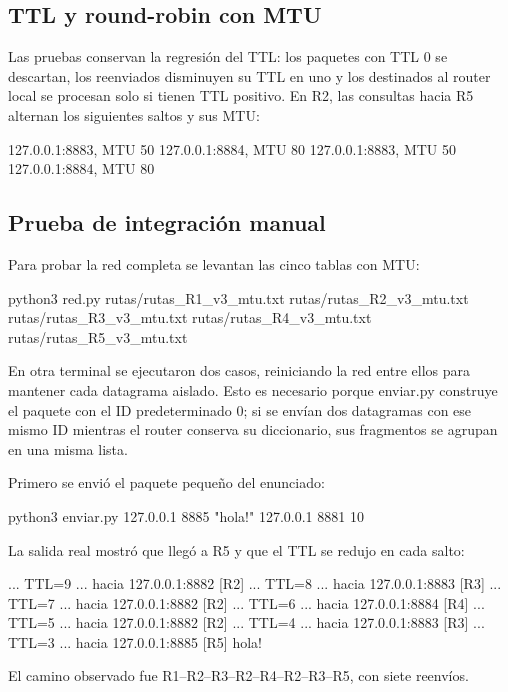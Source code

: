 \documentclass[
	spanish, %
	letterpaper, oneside
]{article}
\newcommand{\codeunderscore}{\textunderscore\allowbreak}
\newcommand{\code}[1]{{\let\_\codeunderscore#1}}     %
\begin{document}
\subsection{TTL y round-robin con MTU}
Las pruebas conservan la regresión del TTL: los paquetes con TTL 0 se descartan, los reenviados disminuyen su TTL en uno y los destinados al router local se procesan solo si tienen TTL positivo. En R2, las consultas hacia R5 alternan los siguientes saltos y sus MTU:
\begin{salida}
127.0.0.1:8883, MTU 50
127.0.0.1:8884, MTU 80
127.0.0.1:8883, MTU 50
127.0.0.1:8884, MTU 80
\end{salida}

\subsection{Prueba de integración manual}
Para probar la red completa se levantan las cinco tablas con MTU:
\begin{salida}
python3 red.py rutas/rutas_R1_v3_mtu.txt rutas/rutas_R2_v3_mtu.txt rutas/rutas_R3_v3_mtu.txt rutas/rutas_R4_v3_mtu.txt rutas/rutas_R5_v3_mtu.txt
\end{salida}
En otra terminal se ejecutaron dos casos, reiniciando la red entre ellos para mantener cada datagrama aislado. Esto es necesario porque \code{enviar.py} construye el paquete con el ID predeterminado 0; si se envían dos datagramas con ese mismo ID mientras el router conserva su diccionario, sus fragmentos se agrupan en una misma lista.

Primero se envió el paquete pequeño del enunciado:
\begin{salida}
python3 enviar.py 127.0.0.1 8885 "hola!" 127.0.0.1 8881 10
\end{salida}
La salida real mostró que llegó a R5 y que el TTL se redujo en cada salto:
\begin{salida}
[R1] ... TTL=9 ... hacia 127.0.0.1:8882
[R2] ... TTL=8 ... hacia 127.0.0.1:8883
[R3] ... TTL=7 ... hacia 127.0.0.1:8882
[R2] ... TTL=6 ... hacia 127.0.0.1:8884
[R4] ... TTL=5 ... hacia 127.0.0.1:8882
[R2] ... TTL=4 ... hacia 127.0.0.1:8883
[R3] ... TTL=3 ... hacia 127.0.0.1:8885
[R5] hola!
\end{salida}
El camino observado fue R1--R2--R3--R2--R4--R2--R3--R5, con siete reenvíos.
\end{document}

